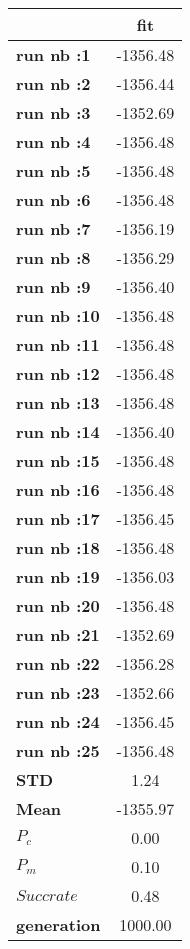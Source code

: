 \begin{tiny}\begin{tabular}{|l|c|}
\hline
&\textbf{fit}\\\hline
\textbf{run nb :1}&-1356.48\\\hline
\textbf{run nb :2}&-1356.44\\\hline
\textbf{run nb :3}&-1352.69\\\hline
\textbf{run nb :4}&-1356.48\\\hline
\textbf{run nb :5}&-1356.48\\\hline
\textbf{run nb :6}&-1356.48\\\hline
\textbf{run nb :7}&-1356.19\\\hline
\textbf{run nb :8}&-1356.29\\\hline
\textbf{run nb :9}&-1356.40\\\hline
\textbf{run nb :10}&-1356.48\\\hline
\textbf{run nb :11}&-1356.48\\\hline
\textbf{run nb :12}&-1356.48\\\hline
\textbf{run nb :13}&-1356.48\\\hline
\textbf{run nb :14}&-1356.40\\\hline
\textbf{run nb :15}&-1356.48\\\hline
\textbf{run nb :16}&-1356.48\\\hline
\textbf{run nb :17}&-1356.45\\\hline
\textbf{run nb :18}&-1356.48\\\hline
\textbf{run nb :19}&-1356.03\\\hline
\textbf{run nb :20}&-1356.48\\\hline
\textbf{run nb :21}&-1352.69\\\hline
\textbf{run nb :22}&-1356.28\\\hline
\textbf{run nb :23}&-1352.66\\\hline
\textbf{run nb :24}&-1356.45\\\hline
\textbf{run nb :25}&-1356.48\\\hline
\textbf{STD}&1.24\\\hline
\textbf{Mean}&-1355.97\\\hline
\textbf{$P_c$}&0.00\\\hline
\textbf{$P_{m}$}&0.10\\\hline
\textbf{$Succ rate$}&0.48\\\hline
\textbf{generation}&1000.00\\\hline
\end{tabular}
\end{tiny}